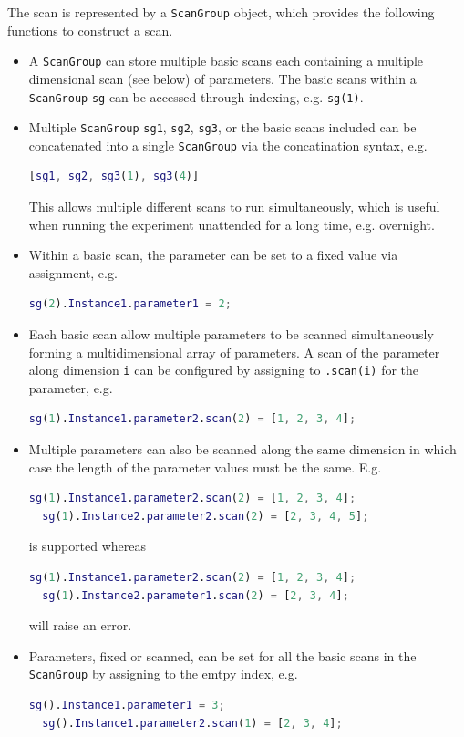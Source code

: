The scan is represented by a \verb`ScanGroup` object,
which provides the following functions to construct a scan.
\begin{itemize}
\item A \verb`ScanGroup` can store multiple basic scans each containing
  a multiple dimensional scan (see below) of parameters.
  The basic scans within a \verb`ScanGroup` \verb`sg` can be accessed through
  indexing, e.g. \verb`sg(1)`.
\item Multiple \verb`ScanGroup` \verb`sg1`, \verb`sg2`, \verb`sg3`, or the basic scans included
  can be concatenated into a single \verb`ScanGroup` via the concatination syntax, e.g.
  \begin{lstlisting}[language=Matlab]
  [sg1, sg2, sg3(1), sg3(4)]
\end{lstlisting}
  This allows multiple different scans to run simultaneously,
  which is useful when running the experiment unattended for a long time, e.g. overnight.
\item Within a basic scan,
  the parameter can be set to a fixed value via assignment, e.g.
  \begin{lstlisting}[language=Matlab]
  sg(2).Instance1.parameter1 = 2;
\end{lstlisting}
\item Each basic scan allow multiple parameters to be scanned simultaneously
  forming a multidimensional array of parameters.
  A scan of the parameter along dimension \verb`i` can be configured
  by assigning to \verb`.scan(i)` for the parameter, e.g.
  \begin{lstlisting}[language=Matlab]
  sg(1).Instance1.parameter2.scan(2) = [1, 2, 3, 4];
\end{lstlisting}
\item Multiple parameters can also be scanned along the same dimension
  in which case the length of the parameter values must be the same. E.g.
  \begin{lstlisting}[language=Matlab]
  sg(1).Instance1.parameter2.scan(2) = [1, 2, 3, 4];
  sg(1).Instance2.parameter2.scan(2) = [2, 3, 4, 5];
\end{lstlisting}
  is supported whereas
  \begin{lstlisting}[language=Matlab]
  sg(1).Instance1.parameter2.scan(2) = [1, 2, 3, 4];
  sg(1).Instance2.parameter1.scan(2) = [2, 3, 4];
\end{lstlisting}
  will raise an error.
\item Parameters, fixed or scanned, can be set for all the basic scans in the \verb`ScanGroup`
  by assigning to the emtpy index, e.g.
  \begin{lstlisting}[language=Matlab]
  sg().Instance1.parameter1 = 3;
  sg().Instance1.parameter2.scan(1) = [2, 3, 4];
\end{lstlisting}
\end{itemize}

